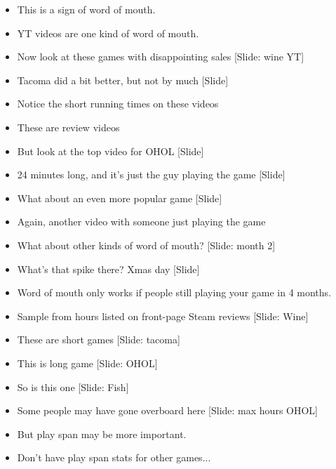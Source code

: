 \documentclass[12pt]{article}
\begin{document}
{\begin{itemize}
\item This is a sign of word of mouth.

\item YT videos are one kind of word of mouth.

\item Now look at these games with disappointing sales [Slide:  wine YT]

\item Tacoma did a bit better, but not by much [Slide]

\item Notice the short running times on these videos

\item These are review videos

\item But look at the top video for OHOL [Slide]

\item 24 minutes long, and it's just the guy playing the game [Slide]

\item What about an even more popular game [Slide]

\item Again, another video with someone just playing the game

\item What about other kinds of word of mouth? [Slide:  month 2]

\item What's that spike there?  Xmas day [Slide]

\item Word of mouth only works if people still playing your game in 4 months.

\item Sample from hours listed on front-page Steam reviews [Slide: Wine]

\item These are short games [Slide: tacoma]

\item This is long game [Slide: OHOL]

\item So is this one [Slide: Fish]

\item Some people may have gone overboard here [Slide: max hours OHOL]

\item But play span may be more important.

\item Don't have play span stats for other games...


\end{itemize}}
\end{document}
